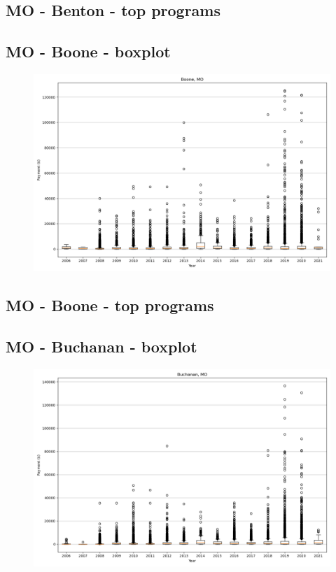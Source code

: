 \subsection*{MO - Benton - top programs}

\newpage
\subsection*{MO - Boone - boxplot}
\begin{figure}[h]
\centering
\includegraphics[width=7in]{../output/boxplots/counties/Boone-MO_boxplot.png}
\end{figure}


\subsection*{MO - Boone - top programs}

\newpage
\subsection*{MO - Buchanan - boxplot}
\begin{figure}[h]
\centering
\includegraphics[width=7in]{../output/boxplots/counties/Buchanan-MO_boxplot.png}
\end{figure}


